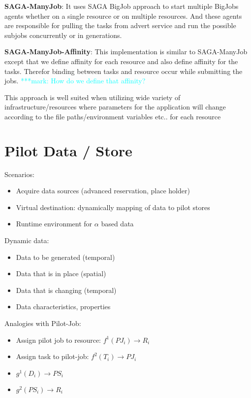 \documentclass[]{article}
\newcommand{\msnote}[1]{ {\textcolor{cyan} { ***mark: #1 }}}
\begin{document}
\textbf{SAGA-ManyJob}:
It uses SAGA BigJob approach to start multiple BigJobs agents 
whether on a single resource or on multiple resources. And 
these agents are responsible for pulling the tasks from advert 
service and run the possible subjobs concurrently or in generations.



\textbf{SAGA-ManyJob-Affinity}:
This implementation is similar to SAGA-ManyJob except that we define affinity for each resource and also define affinity for the tasks. Therefor binding between tasks and resource occur while submitting the jobs.
\msnote{How do we define that affinity?}

This approach is well suited when utilizing wide variety of infrastructure/resources where parameters for the application will change according to the file paths/environment variables etc.. for each resource



\section{Pilot Data / Store}
\noindent
Scenarios:
\begin{itemize}
	\item Acquire data sources (advanced reservation, place holder)
	\item Virtual destination: dynamically mapping of data to pilot stores
	\item Runtime environment for $\alpha$ based data
\end{itemize}
	
\noindent	
Dynamic data:
\begin{itemize}
	\item Data to be generated (temporal)
	\item Data that is in place (spatial)
	\item Data that is changing (temporal)
	\item Data characteristics, properties
\end{itemize}	

\noindent
Analogies with Pilot-Job:
\begin{itemize}
	\item Assign pilot job to resource: $f^{1}(PJ_i) \rightarrow R_i$
	\item Assign task to pilot-job: $f^{2}(T_i) \rightarrow PJ_i$ 

	\item $g^{1} (D_i) \rightarrow PS_i$
	\item $g^{2} (PS_i) \rightarrow R_i$
\end{itemize}
\end{document}
